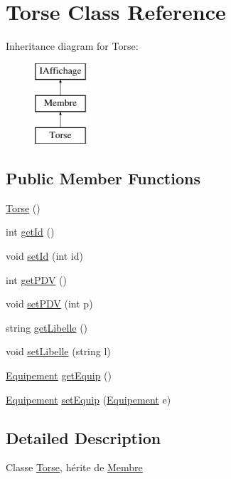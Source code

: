 \hypertarget{class_torse}{\section{\-Torse \-Class \-Reference}
\label{class_torse}
}
\-Inheritance diagram for \-Torse\-:\begin{figure}[H]
\begin{center}
\leavevmode
\includegraphics[height=3.000000cm]{class_torse}
\end{center}
\end{figure}
\subsection*{\-Public \-Member \-Functions}
\begin{DoxyCompactItemize}
\item 
\hyperlink{class_torse_a5bfcd88fc96057dd794cbae945d0b541}{\-Torse} ()
\item 
int \hyperlink{class_torse_a58614d9c4ce5021515e9a09d68e3366e}{get\-Id} ()
\item 
void \hyperlink{class_torse_a797b1977bbc9dd5ab6bb5b6731e3081f}{set\-Id} (int id)
\item 
int \hyperlink{class_torse_a2f13314c8454f1be93a17ecd3be02408}{get\-P\-D\-V} ()
\item 
void \hyperlink{class_torse_a88aeb0ac624296d654a245522e9a7a4c}{set\-P\-D\-V} (int p)
\item 
string \hyperlink{class_torse_a4e2fefc2b6e0486d26b33edcd50d0fb4}{get\-Libelle} ()
\item 
void \hyperlink{class_torse_a89ac35e98847c1f39f8bdb840efddd75}{set\-Libelle} (string l)
\item 
\hyperlink{class_equipement}{\-Equipement} \hyperlink{class_torse_aef7412e7ca619d0855aa890d84b4a609}{get\-Equip} ()
\item 
\hyperlink{class_equipement}{\-Equipement} \hyperlink{class_torse_a59c9a4895878649516f5f0622cbce083}{set\-Equip} (\hyperlink{class_equipement}{\-Equipement} e)
\end{DoxyCompactItemize}


\subsection{\-Detailed \-Description}
\-Classe \hyperlink{class_torse}{\-Torse}, hérite de \hyperlink{class_membre}{\-Membre} 

